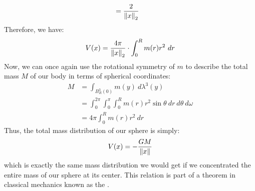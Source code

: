 \begin{example}
\begin{align*}
		&= \frac{2}{\norm{x}_2}
	\end{align*}
	Therefore, we have:
	\begin{align*}
		V(x) = \frac{4\pi}{\norm{x}_2} \cdot \int_0^R m(r) r^2 ~dr
	\end{align*}
	Now, we can once again use the rotational symmetry of $m$ to describe the total mass $M$ of our body in terms of spherical coordinates:
	\begin{align*}
		M 
		&= \int_{B^3_R(0)} m(y) ~d\lambda^3(y)\\
		&= \int_0^{2\pi} \int_0^\pi \int_0^R m(r) r^2 \sin \theta ~dr ~d\theta ~d\omega\\
		&= 4 \pi \int_0^R m(r) r^2 ~dr
	\end{align*}
	Thus, the total mass distribution of our sphere is simply:
	\begin{align*}
		V(x) = -\frac{GM}{\norm{x}}
	\end{align*}
	which is exactly the same mass distribution we would get if we concentrated the entire mass of our sphere at its center. This relation is part of a theorem in classical mechanics known as the .
\end{example}
\clearpage
